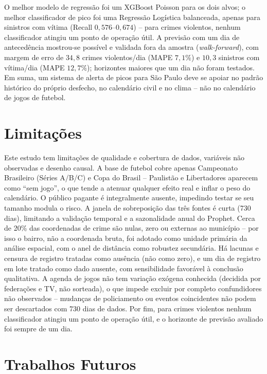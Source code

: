 \documentclass[12pt]{article}
\begin{document}
O melhor modelo de regressão foi um XGBoost Poisson para os dois alvos; o
melhor classificador de pico foi uma Regressão Logística balanceada,
apenas para sinistros com vítima (Recall $0,576$--$0,674$) -- para crimes
violentos, nenhum classificador atingiu um ponto de operação útil. A
previsão com um dia de antecedência mostrou-se possível e validada fora
da amostra (\emph{walk-forward}), com margem de erro de $34,8$ crimes
violentos/dia (MAPE $7,1\%$) e $10,3$ sinistros com vítima/dia (MAPE
$12,7\%$); horizontes maiores que um dia não foram testados. Em suma, um
sistema de alerta de picos para São Paulo deve se apoiar no padrão
histórico do próprio desfecho, no calendário civil e no clima -- não no
calendário de jogos de futebol.

\section{Limitações}

Este estudo tem limitações de qualidade e cobertura de dados, variáveis
não observadas e desenho causal. A base de futebol cobre apenas
Campeonato Brasileiro (Séries A/B/C) e Copa do Brasil -- Paulistão e
Libertadores aparecem como ``sem jogo'', o que tende a atenuar qualquer
efeito real e inflar o peso do calendário. O público pagante é
integralmente ausente, impedindo testar se seu tamanho modula o risco. A
janela de sobreposição das três fontes é curta (730 dias), limitando a
validação temporal e a sazonalidade anual do Prophet. Cerca de 20\% das
coordenadas de crime são nulas, zero ou externas ao município -- por isso
o bairro, não a coordenada bruta, foi adotado como unidade primária da
análise espacial, com o anel de distância como robustez secundária. Há
lacunas e
censura de registro tratadas como ausência (não como zero), e um dia de
registro em lote tratado como dado ausente, com sensibilidade favorável à
conclusão qualitativa. A agenda de jogos não tem variação exógena
conhecida (decidida por federações e TV, não sorteada), o que impede
excluir por completo confundidores não observados -- mudanças de
policiamento ou eventos coincidentes não podem ser descartados com 730
dias de dados. Por fim, para crimes violentos nenhum classificador
atingiu um ponto de operação útil, e o horizonte de previsão avaliado foi
sempre de um dia.

\section{Trabalhos Futuros}
\end{document}

